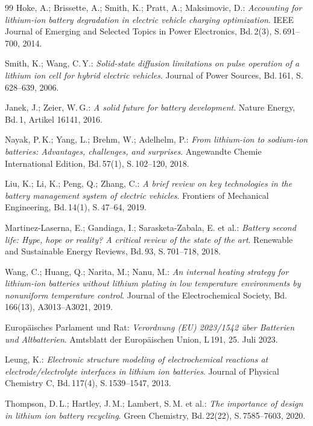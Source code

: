 ﻿\documentclass[a4paper,12pt]{article}
\theoremstyle{definition}
\begin{document}
\begin{thebibliography}{99}
  Hoke, A.; Brissette, A.; Smith, K.; Pratt, A.; Maksimovic, D.:
  \emph{Accounting for lithium-ion battery degradation in electric vehicle
    charging optimization}.
  IEEE Journal of Emerging and Selected Topics in Power Electronics,
  Bd.\,2(3), S.\,691--700, 2014.

  Smith, K.; Wang, C.\,Y.:
  \emph{Solid-state diffusion limitations on pulse operation of a
    lithium ion cell for hybrid electric vehicles}.
  Journal of Power Sources, Bd.\,161, S.\,628--639, 2006.

  Janek, J.; Zeier, W.\,G.:
  \emph{A solid future for battery development}.
  Nature Energy, Bd.\,1, Artikel 16141, 2016.

  Nayak, P.\,K.; Yang, L.; Brehm, W.; Adelhelm, P.:
  \emph{From lithium-ion to sodium-ion batteries: Advantages, challenges,
    and surprises}.
  Angewandte Chemie International Edition, Bd.\,57(1), S.\,102--120, 2018.

  Liu, K.; Li, K.; Peng, Q.; Zhang, C.:
  \emph{A brief review on key technologies in the battery management system
    of electric vehicles}.
  Frontiers of Mechanical Engineering, Bd.\,14(1), S.\,47--64, 2019.

  Martinez-Laserna, E.; Gandiaga, I.; Sarasketa-Zabala, E. et al.:
  \emph{Battery second life: Hype, hope or reality? A critical review of
    the state of the art}.
  Renewable and Sustainable Energy Reviews, Bd.\,93, S.\,701--718, 2018.

  Wang, C.; Huang, Q.; Narita, M.; Nanu, M.:
  \emph{An internal heating strategy for lithium-ion batteries without
    lithium plating in low temperature environments by nonuniform temperature
    control}.
  Journal of the Electrochemical Society, Bd.\,166(13), A3013--A3021, 2019.

  Europ\"aisches Parlament und Rat:
  \emph{Verordnung (EU) 2023/1542 \"uber Batterien und Altbatterien}.
  Amtsblatt der Europ\"aischen Union, L\,191, 25. Juli 2023.

  Leung, K.:
  \emph{Electronic structure modeling of electrochemical reactions at
    electrode/electrolyte interfaces in lithium ion batteries}.
  Journal of Physical Chemistry C, Bd.\,117(4), S.\,1539--1547, 2013.

  Thompson, D.\,L.; Hartley, J.\,M.; Lambert, S.\,M. et al.:
  \emph{The importance of design in lithium ion battery recycling}.
  Green Chemistry, Bd.\,22(22), S.\,7585--7603, 2020.


\end{thebibliography}
\end{document}
